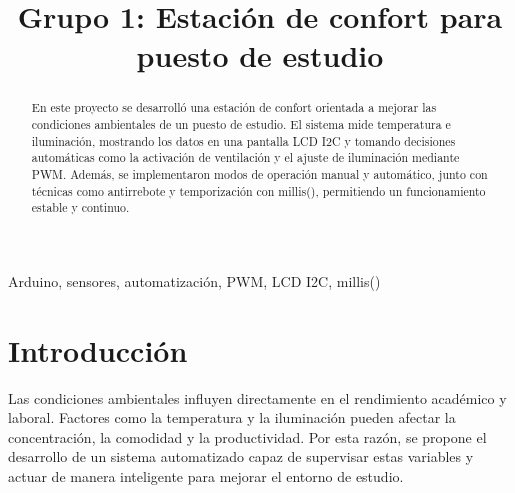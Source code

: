 \documentclass[conference]{IEEEtran}
\begin{document}
\title{Grupo 1: Estación de confort para puesto de estudio}

\author{
    \and
    \and
    \and
}

\maketitle

\begin{abstract}
En este proyecto se desarrolló una estación de confort orientada a mejorar las condiciones 
ambientales de un puesto de estudio. El sistema mide temperatura e iluminación, mostrando 
los datos en una pantalla LCD I2C y tomando decisiones automáticas como la activación de 
ventilación y el ajuste de iluminación mediante PWM. Además, se implementaron modos de 
operación manual y automático, junto con técnicas como antirrebote y temporización con millis(), 
permitiendo un funcionamiento estable y continuo.
\end{abstract}

\begin{IEEEkeywords}
Arduino, sensores, automatización, PWM, LCD I2C, millis()
\end{IEEEkeywords}

\section{Introducción}
Las condiciones ambientales influyen directamente en el rendimiento académico y laboral. 
Factores como la temperatura y la iluminación pueden afectar la concentración, la comodidad 
y la productividad. Por esta razón, se propone el desarrollo de un sistema automatizado capaz 
de supervisar estas variables y actuar de manera inteligente para mejorar el entorno de estudio.
\end{document}
